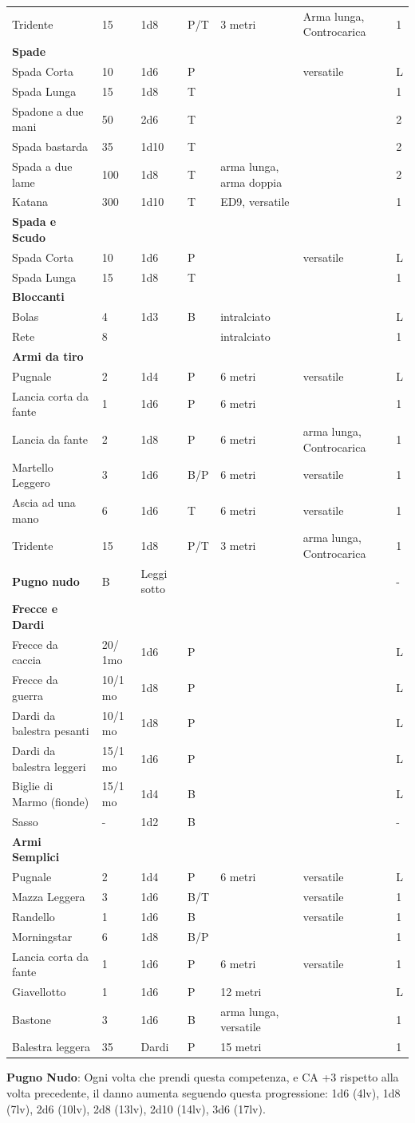 \documentclass[a4paper,11pt,twoside,openany]{book}
\begin{document}
{\begin{longtable}{|L{3.5cm} |k{1,3cm} |k{1.5cm}| k{1.3cm} |L{3.2cm} |k{2.7cm}|k{2cm}|}
	Tridente & 15 & 1d8 & P/T & 3 metri & Arma lunga, Controcarica &1\tabularnewline
	\textbf{Spade} & & & & & &\tabularnewline
	Spada Corta & 10 & 1d6 & P & & versatile&L\tabularnewline
	Spada Lunga & 15 & 1d8 & T & &&1 \tabularnewline
	Spadone a due mani & 50 & 2d6 & T & & &2\tabularnewline
	Spada bastarda & 35 & 1d10 & T & & &2\tabularnewline
	Spada a due lame & 100 & 1d8 & T & arma lunga, arma doppia & &2\tabularnewline
	Katana & 300 & 1d10 & T & ED9, versatile & &1\tabularnewline
	\textbf{Spada e Scudo} & & & & & &\tabularnewline
	Spada Corta & 10 & 1d6 & P & & versatile&L\tabularnewline
	Spada Lunga & 15 & 1d8 & T & & &1\tabularnewline
	\textbf{Bloccanti} & & & & & &\tabularnewline
	Bolas & 4 & 1d3 & B & intralciato & &L\tabularnewline
	Rete & 8 & & & intralciato & &1\tabularnewline
	\textbf{Armi da tiro} & & & & && \tabularnewline
	Pugnale & 2 & 1d4 & P & 6 metri & versatile&L\tabularnewline
	Lancia corta da fante & 1 & 1d6 & P & 6 metri & &1\tabularnewline
	Lancia da fante & 2 & 1d8 & P & 6 metri &arma lunga, Controcarica&1\tabularnewline
	Martello Leggero & 3 & 1d6 & B/P & 6 metri & versatile&1\tabularnewline
	Ascia ad una mano & 6 & 1d6 & T & 6 metri & versatile&1\tabularnewline
	Tridente & 15 & 1d8 & P/T & 3 metri&arma lunga, Controcarica &1\tabularnewline
	\textbf{Pugno nudo} & B & Leggi sotto & & & &-\tabularnewline
	\textbf{Frecce e Dardi} & & & & & &\tabularnewline
	Frecce da caccia & 20/ 1mo & 1d6 & P & & &L\tabularnewline
	Frecce da guerra & 10/1 mo & 1d8 & P & & &L\tabularnewline
	Dardi da balestra pesanti & 10/1 mo & 1d8 & P & & &L\tabularnewline
	Dardi da balestra leggeri & 15/1 mo & 1d6 & P & & &L\tabularnewline
	Biglie di Marmo (fionde) & 15/1 mo & 1d4 & B & & &L\tabularnewline
	Sasso & - & 1d2 & B & & &-\tabularnewline
	\textbf{Armi Semplici} & & & & & &\tabularnewline
	Pugnale & 2 & 1d4 & P & 6 metri & versatile&L\tabularnewline
	Mazza Leggera & 3 & 1d6 & B/T & & versatile&1\tabularnewline
	Randello & 1 & 1d6 & B & & versatile&1\tabularnewline
	Morningstar & 6 & 1d8 & B/P & & &1\tabularnewline
	Lancia corta da fante & 1 & 1d6 & P & 6 metri & versatile&1\tabularnewline
	Giavellotto & 1 & 1d6 & P & 12 metri & &L\tabularnewline
	Bastone & 3 & 1d6 & B & arma lunga, versatile & &1\tabularnewline
	Balestra leggera & 35 & Dardi & P & 15 metri & &1\tabularnewline
\end{longtable}



\textbf{Pugno Nudo}: Ogni volta che prendi questa competenza, e CA +3 rispetto alla volta precedente, il danno aumenta seguendo questa progressione: 1d6 (4lv), 1d8 (7lv), 2d6 (10lv), 2d8 (13lv), 2d10 (14lv), 3d6 (17lv). 

}
\end{document}
